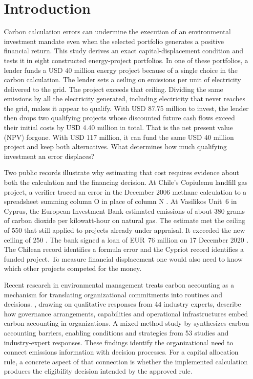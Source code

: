 \section{Introduction}
Carbon calculation errors can undermine the execution of an environmental investment mandate even when the selected portfolio generates a positive financial return. This study derives an exact capital-displacement condition and tests it in eight constructed energy-project portfolios. In one of these portfolios, a lender funds a USD 40 million energy project because of a single choice in the carbon calculation. The lender sets a ceiling on emissions per unit of electricity delivered to the grid. The project exceeds that ceiling. Dividing the same emissions by all the electricity generated, including electricity that never reaches the grid, makes it appear to qualify. With USD 87.75 million to invest, the lender then drops two qualifying projects whose discounted future cash flows exceed their initial costs by USD 4.40 million in total. That is the net present value (NPV) forgone. With USD 117 million, it can fund the same USD 40 million project and keep both alternatives. What determines how much qualifying investment an error displaces?

Two public records illustrate why estimating that cost requires evidence about both the calculation and the financing decision. At Chile's Copiulemu landfill gas project, a verifier traced an error in the December 2006 methane calculation to a spreadsheet summing column O in place of column N \citep[p.~11]{sgs}. At Vasilikos Unit~6 in Cyprus, the European Investment Bank estimated emissions of about 380 grams of carbon dioxide per kilowatt-hour on natural gas. The estimate met the ceiling of 550 that still applied to projects already under appraisal. It exceeded the new ceiling of 250 \citep{eibscore,eibmid}. The bank signed a loan of EUR~76 million on 17 December 2020 \citep{eibloan}. The Chilean record identifies a formula error and the Cypriot record identifies a funded project. To measure financial displacement one would also need to know which other projects competed for the money.

Recent research in environmental management treats carbon accounting as a mechanism for translating organizational commitments into routines and decisions. \citet{ruan2026}, drawing on qualitative responses from 44 industry experts, describe how governance arrangements, capabilities and operational infrastructures embed carbon accounting in organizations. A mixed-method study by \citet{wu2026} synthesizes carbon accounting barriers, enabling conditions and strategies from 53 studies and industry-expert responses. These findings identify the organizational need to connect emissions information with decision processes. For a capital allocation rule, a concrete aspect of that connection is whether the implemented calculation produces the eligibility decision intended by the approved rule.

